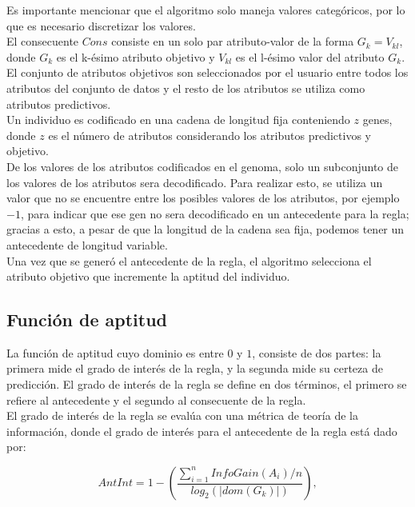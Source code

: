 Es importante mencionar que el algoritmo solo maneja valores categóricos, por lo que es necesario discretizar los valores.
\\

El consecuente $Cons$ consiste en un solo par atributo-valor de la forma $G_k = V_{kl}$, donde $G_k$ es el k-ésimo atributo objetivo y $V_{kl}$ es el l-ésimo valor del atributo $G_k$. El conjunto de atributos objetivos son seleccionados por el usuario entre todos los atributos del conjunto de datos y el resto de los atributos se utiliza como atributos predictivos.
\\

Un individuo es codificado en una cadena de longitud fija conteniendo $z$ genes, donde $z$ es el número de atributos considerando los atributos predictivos y objetivo.
\\

De los valores de los atributos codificados en el genoma, solo un subconjunto de los valores de los atributos sera decodificado. Para realizar esto, se utiliza un valor que no se encuentre entre los posibles valores de los atributos, por ejemplo $-1$, para indicar que ese gen no sera decodificado en un antecedente para la regla; gracias a esto, a pesar de que la longitud de la cadena sea fija, podemos tener un antecedente de longitud variable.
\\

Una vez que se generó el antecedente de la regla, el algoritmo selecciona el atributo objetivo que incremente la aptitud del individuo.

\subsection{Función de aptitud}

La función de aptitud cuyo dominio es entre $0$ y $1$, consiste de dos partes: la primera mide el grado de interés de la regla, y la segunda mide su certeza de predicción. El grado de interés de la regla se define en dos términos, el primero se refiere al antecedente y el segundo al consecuente de la regla.
\\

El grado de interés de la regla se evalúa con una métrica de teoría de la información, donde el grado de interés para el antecedente de la regla está dado por:

\begin{equation} 
\label{eq:1}
AntInt = 1- \left( \frac{\sum\limits_{i=1}^n InfoGain(A_i)/n}
{log_2(\left| dom(G_k) \right|)}
\right),
\end{equation}

